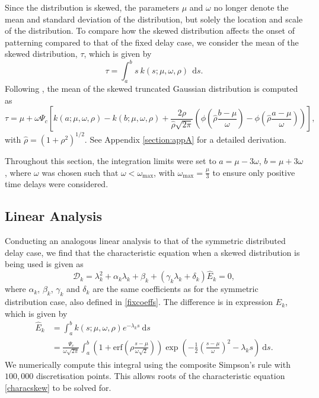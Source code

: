 Since the distribution is skewed, the parameters $\mu$ and $\omega$ no longer denote the mean and standard deviation of the distribution, but solely the location and scale of the distribution. To compare how the skewed distribution affects the onset of patterning compared to that of the fixed delay case, we consider the mean of the skewed distribution, $\tau$, which is given by
\begin{equation}\label{anmean}
    \tau=\int_a^bs\ k(s;\mu,\omega,\rho)\ \ \text{d}s.
\end{equation}
Following \cite{skewed}, the mean of the skewed truncated Gaussian distribution is computed as
\begin{equation}\label{computetau}
\tau=\mu+\omega\Psi_c\left[k(a;\mu,\omega,\rho)-k(b;\mu,\omega,\rho)+\frac{2\rho}{\hat{\rho}\sqrt{2\pi}}\left(\phi\left(\hat{\rho}\frac{b-\mu}{\omega}\right)-\phi\left(\hat{\rho}\frac{a-\mu}{\omega}\right)\right)\right],
\end{equation}
with $\hat{\rho}=\left(1+\rho^2\right)^{1/2}$. See Appendix \ref{section:appA} for a detailed derivation.

Throughout this section, the integration limits were set to $a=\mu-3\omega$, $b=\mu+3\omega$, where $\omega$ was chosen such that $\omega<\omega_{\max}$, with $\omega_{\max}=\frac{\mu}{3}$ to ensure only positive time delays were considered.
\subsection{Linear Analysis}\label{section:linanalskew}
Conducting an analogous linear analysis to that of the symmetric distributed delay case, we find that the characteristic equation when a skewed distribution is being used is given as
\begin{equation}\label{characskew}
  \mathcal{D}_k=\lambda_k^2+\alpha_k\lambda_k+\beta_k+(\gamma_k\lambda_k+\delta_k)\hat{E}_k=0,
\end{equation}
where $\alpha_k$, $\beta_k$, $\gamma_k$ and $\delta_k$ are the same coefficients as for the symmetric distribution case, also defined in \eqref{fixcoeffs}. The difference is in expression $\hat{E}_k$, which is given by
\begin{equation}\label{Ehat}
    \begin{split}
\hat{E}_k&=\int_a^bk(s;\mu,\omega,\rho)e^{-\lambda_k s}\ \text{d}s\\
&=\frac{\Psi_c}{\omega\sqrt{2\pi}}\int_a^b\left(1+\text{erf}\left(\rho\frac{s-\mu}{\omega\sqrt{2}}\right)\right)\exp\left(-\frac{1}{2}\left(\frac{s-\mu}{\omega}\right)^2-\lambda_ks\right)\ \text{d}s.
    \end{split}
\end{equation}
We numerically compute this integral using the composite Simpson's rule with $100,000$ discretisation points. This allows roots of the characteristic equation \eqref{characskew} to be solved for.

